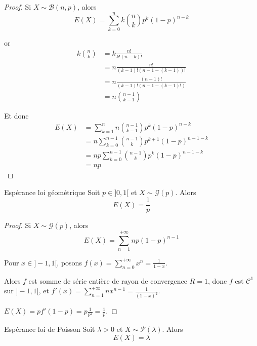 \begin{proof}
    Si $X \sim \mathcal B(n, p)$, alors
       $$ E(X) = \sum_{k = 0}^n k \binom n k p^k (1 - p)^{n - k} $$
    
    or
    \begin{align}
        k \binom n k & = k \frac{n!}{k!(n - k)!} \\
        & = n \frac{n!}{(k - 1)! (n - 1 - (k - 1))!} \\
        & = n \frac{(n - 1)!}{(k - 1)!(n - 1 - (k - 1)!)} \\
        & = n \binom{n - 1}{k - 1}
    \end{align}

    Et donc 
    \begin{align}
        E(X) & = \sum_{k = 1}^n n \binom{n - 1}{k - 1} p^k (1 - p)^{n - k} \\
        & = n \sum_{k = 0 }^{n - 1} \binom{n - 1}{k} p^{k + 1} (1 - p)^{n - 1 - k} \\
        & = n p \sum_{k = 0}^{n - 1} \binom{n - 1}{k} p^k (1 - p)^{n - 1 - k} \\
        & = n p
    \end{align}
        
\end{proof}

\begin{proposition}{Espérance loi géométrique}{}
    Soit $p \in ]0, 1[$ et $X \sim \mathcal G(p)$. Alors 
    $$ E(X) = \frac 1 p $$
\end{proposition}

\begin{proof}
    Si $X \sim \mathcal G(p)$, alors 
    $$E(X) = \sum_{n = 1}^{+ \infty} n p (1 - p)^{n - 1}$$

    Pour $x \in ]-1, 1[$, posons $\displaystyle f(x) = \sum_{n = 0}^{+ \infty} x^n = \frac 1 {1 - x}$.

    Alors $f$ est somme de série entière de rayon de convergence $R = 1$, donc 
    $f$ est $\mathscr C^{1}$ sur $]-1, 1[$, et
    $\displaystyle f'(x) = \sum_{n = 1}^{+ \infty} n x^{n - 1} = \frac 1 {(1 - x)^2}$.

    $E(X) = p f'\left( 1 - p \right) = p \frac 1 {p^2} = \frac 1 p$.

\end{proof}

\begin{proposition}{Espérance loi de Poisson}{}
    Soit $\lambda > 0$ et $X \sim \mathcal P(\lambda)$. Alors 
    $$ E(X) = \lambda $$
\end{proposition}


